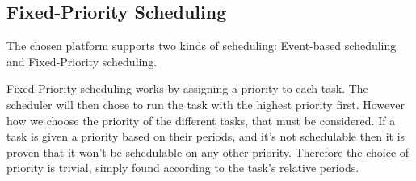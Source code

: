 








\subsection{\textbf{Fixed-Priority Scheduling}}\label{prioratySch}
The chosen platform supports two kinds of scheduling: Event-based scheduling and Fixed-Priority scheduling\cite{OILManual}.

Fixed Priority scheduling works by assigning a priority to each task. The scheduler will then chose to run the task with the highest priority first. However how we choose the priority of the different tasks,  that must be considered. If a task is given a priority based on their periods, and it's not schedulable then it is proven that it won't be schedulable on any other priority. Therefore the choice of priority is trivial, simply found according to the task's relative periods.

